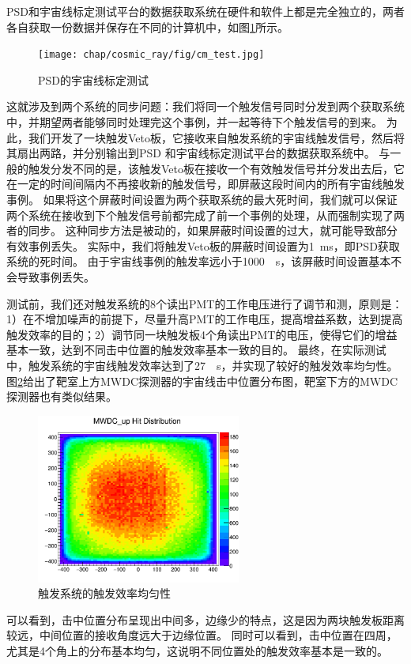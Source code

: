 PSD和宇宙线标定测试平台的数据获取系统在硬件和软件上都是完全独立的，两者各自获取一份数据并保存在不同的计算机中，如图\ref{fig:cosmic_ray:cm_test}所示。
\label{sec:cosmic_ray:cm_test}
\begin{figure}[htbp]
	\centering
	\texttt{[image: chap/cosmic\_ray/fig/cm\_test.jpg]}
	\caption{PSD的宇宙线标定测试}
	\label{fig:cosmic_ray:cm_test}
\end{figure}
这就涉及到两个系统的同步问题：我们将同一个触发信号同时分发到两个获取系统中，并期望两者能够同时处理完这个事例，并一起等待下个触发信号的到来。
为此，我们开发了一块触发Veto板，它接收来自触发系统的宇宙线触发信号，然后将其扇出两路，并分别输出到PSD
和宇宙线标定测试平台的数据获取系统中。
与一般的触发分发不同的是，该触发Veto板在接收一个有效触发信号并分发出去后，它在一定的时间间隔内不再接收新的触发信号，即屏蔽这段时间内的所有宇宙线触发事例。
如果将这个屏蔽时间设置为两个获取系统的最大死时间，我们就可以保证两个系统在接收到下个触发信号前都完成了前一个事例的处理，从而强制实现了两者的同步。
这种同步方法是被动的，如果屏蔽时间设置的过大，就可能导致部分有效事例丢失。
实际中，我们将触发Veto板的屏蔽时间设置为\SI{1}{ms}，即PSD获取系统的死时间。
由于宇宙线事例的触发率远小于\SI{1000}{\per\second}，该屏蔽时间设置基本不会导致事例丢失。

测试前，我们还对触发系统的8个读出PMT的工作电压进行了调节和测，原则是：1）在不增加噪声的前提下，尽量升高PMT的工作电压，提高增益系数，达到提高触发效率的目的；2）调节同一块触发板4个角读出PMT的电压，使得它们的增益基本一致，达到不同击中位置的触发效率基本一致的目的。
最终，在实际测试中，触发系统的宇宙线触发效率达到了\SI{27}{\per\second}，并实现了较好的触发效率均匀性。
图\ref{fig:cosmic_ray:hitposition}给出了靶室上方MWDC探测器的宇宙线击中位置分布图，靶室下方的MWDC探测器也有类似结果。
\begin{figure}[htb]
\centering
\includegraphics[width=0.6\textwidth]{chap/cosmic_ray/fig/hitposition_mwdc.png}
\caption{触发系统的触发效率均匀性}
\label{fig:cosmic_ray:hitposition}
\end{figure}
可以看到，击中位置分布呈现出中间多，边缘少的特点，这是因为两块触发板距离较远，中间位置的接收角度远大于边缘位置。
同时可以看到，击中位置在四周，尤其是4个角上的分布基本均匀，这说明不同位置处的触发效率基本是一致的。

